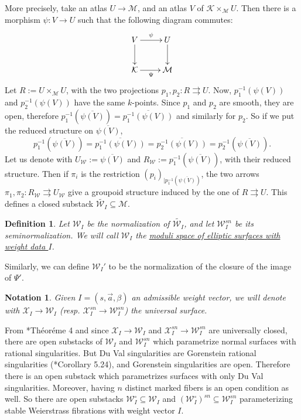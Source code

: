 \documentclass[11pt]{amsart}
\newcommand{\cE}{\mathcal{W}}
\newcommand{\sX}{\mathscr{X}}
\newcommand{\Kg}{\mathcal{K}}
\newtheorem{Def}[theorem]{Definition}
\newtheorem{Notation}[theorem]{Notation}
\theoremstyle{definition}
\begin{document}
 More precisely, take an atlas $U \to \mathcal{M}$,
and an atlas $V$ of $\Kg\times_{\mathcal{M}}U$. Then
there is a morphism
 $\psi:V \to U$ such that the following diagram commutes:
 $$\xymatrix{V \ar[r]^{\psi} \ar[d] & U\ar[d] \\ \Kg \ar[r]_{\Psi} & \mathcal{M}}$$
Let $R:=U \times_{\mathcal{M}}U$,
with the two projections $p_1,p_2:R\rightrightarrows U$. Now, $p_1^{-1}(\psi(V))$ and $p_2^{-1}(\psi(V))$ have the same $k$-points. Since
$p_1$ and $p_2$ are smooth, they are open, therefore $p_1^{-1}(\overline{\psi(V)})=\overline{p_1^{-1}(\psi(V))}$ and similarly for $p_2$. So
if we put the reduced structure on $\overline{\psi(V)}$, 
$$p_1^{-1}(\overline{\psi(V)})=
\overline{p_1^{-1}(\psi(V))}=\overline{p_2^{-1}(\psi(V))}=p_2^{-1}(
\overline{\psi(V)}).$$
Let us denote with $U_\mathcal{W}:=\overline{\psi(V)}$ and
$R_\mathcal{W}:=p_1^{-1}(\overline{\psi(V)})$, with their reduced structure.
Then if $\pi_i$ is the restriction $(p_i)_{|p_1^{-1}(\overline{\psi(V)})}$, the two arrows
$\pi_1,\pi_2:R_\cE \rightrightarrows U_\cE$ give a groupoid structure induced
by the one of $R\rightrightarrows U$. This defines a closed substack
$\widetilde{\mathcal{W}_{I}} \subseteq \mathcal{M}$.
\begin{Def}\label{Def:EI:and:EIsn}
 Let $\mathcal{W}_I$ be the normalization of $\widetilde{\mathcal{W}_I}$, and let $\cE_I^{sn}$ be its seminormalization.
 We will call $\mathcal{W}_I$ the \underline{moduli space of elliptic surfaces with
 weight data $I$}.
\end{Def}
Similarly, we can define $\cE_I'$ to be the normalization of the closure of the image of $\Psi'$. 
\begin{Notation}
  Given $I=(s,\vec{a},\beta)$ an admissible weight vector, we will denote with $\sX_I \to \cE_I$ (resp. $\sX_I^{sn} \to \cE_I^{sn}$) the universal surface.
\end{Notation}
 From \cite{Elkik}*{Th\'eor\'eme 4} and since
 $\sX_I \to \cE_I$  and $\sX_I^{sn} \to \cE_I^{sn}$ are universally closed, there are open substacks of $\cE_I$ and $\cE_I^{sn}$ which parametrize normal surfaces with rational singularities. But Du Val singularities are Gorenstein rational singularities (\cite{KM}*{Corollary 5.24}), and Gorenstein singularities are open. Therefore there is an open substack which parametrizes surfaces with only Du Val singularities. Moreover, having $n$ distinct marked fibers is an open condition as well. So there are open substacks $\cE_I^\circ \subseteq \cE_I$ and $(\cE_I^\circ)^{sn} \subseteq \cE_I^{sn}$ parameterizing stable Weierstrass fibrations with weight vector $I$.
 
\end{document}
